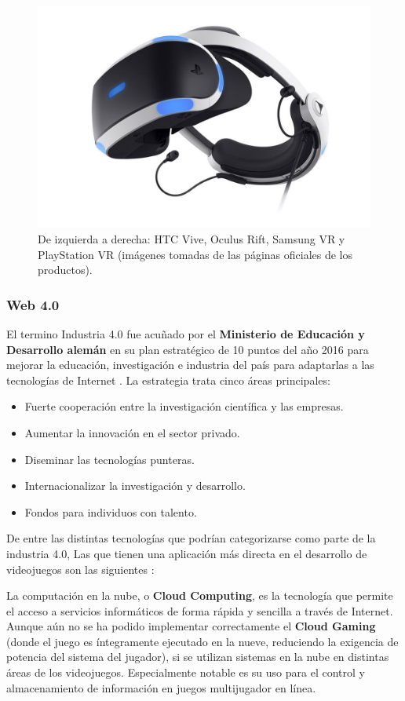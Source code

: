 \begin{figure}[!htb]
\begin {minipage}{0.24\textwidth}
   \end{minipage}
      \begin {minipage}{0.24\textwidth}
     \centering
     \includegraphics[width=0.7\linewidth, left]{images/estadodelarte/mercado/foto-sony-vr}
   \end{minipage}
   \caption{De izquierda a derecha: HTC Vive, Oculus Rift, Samsung VR y PlayStation VR (imágenes tomadas de las páginas oficiales de los productos).}
	\label{fotos_vr}
\end{figure}

\subsubsection{Web 4.0}
El termino Industria 4.0 fue acuñado por el \textbf{Ministerio de Educación y Desarrollo alemán} en su plan estratégico de 10 puntos del año 2016 para mejorar la educación, investigación e industria del país para adaptarlas a las tecnologías de Internet \cite{web_4_0}. La estrategia trata cinco áreas principales:
\begin{itemize}
\item Fuerte cooperación entre la investigación científica y las empresas.
\item Aumentar la innovación en el sector privado.
\item Diseminar las tecnologías punteras.
\item Internacionalizar la investigación y desarrollo.
\item Fondos para individuos con talento.
\end{itemize}

De entre las distintas tecnologías que podrían categorizarse como parte de la industria 4.0, Las que tienen una aplicación más directa en el desarrollo de videojuegos son las siguientes \cite{libro_blanco}:

La computación en la nube, o \textbf{Cloud Computing}, es la tecnología que permite el acceso a servicios informáticos de forma rápida y sencilla a través de Internet. Aunque aún no se ha podido implementar correctamente el \textbf{Cloud Gaming} (donde el juego es íntegramente ejecutado en la nueve, reduciendo la exigencia de potencia del sistema del jugador), si se utilizan sistemas en la nube en distintas áreas de los videojuegos. Especialmente notable es su uso para el control y almacenamiento de información en juegos multijugador en línea.

